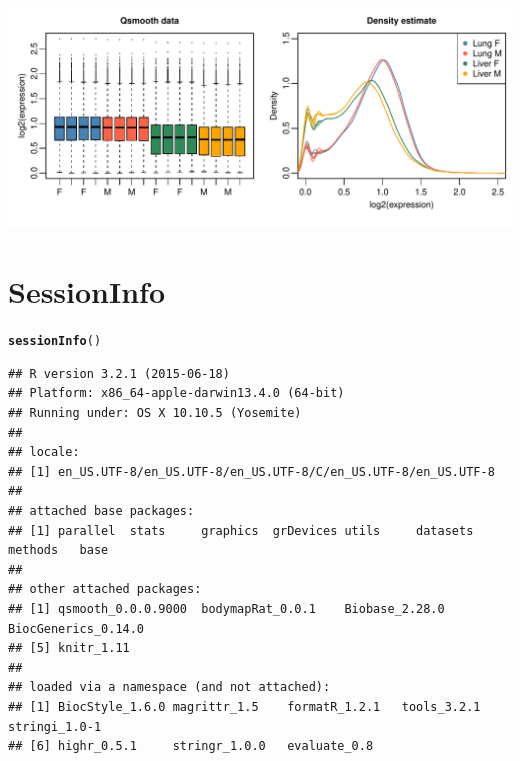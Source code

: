 \documentclass{article}\usepackage[]{graphicx}\usepackage[usenames,dvipsnames]{color}
\makeatletter
\def\maxwidth{ %
  \ifdim\Gin@nat@width>\linewidth
    \linewidth
  \else
    \Gin@nat@width
  \fi
}
\newcommand{\hlstd}[1]{\textcolor[rgb]{0.345,0.345,0.345}{#1}}%
\newcommand{\hlkwd}[1]{\textcolor[rgb]{0.737,0.353,0.396}{\textbf{#1}}}%
\newenvironment{kframe}{%
 \def\at@end@of@kframe{}%
 \ifinner\ifhmode%
  \def\at@end@of@kframe{\end{minipage}}%
  \begin{minipage}{\columnwidth}%
 \fi\fi%
 \def\FrameCommand##1{\hskip\@totalleftmargin \hskip-\fboxsep
 \colorbox{shadecolor}{##1}\hskip-\fboxsep
     \hskip-\linewidth \hskip-\@totalleftmargin \hskip\columnwidth}%
 \MakeFramed {\advance\hsize-\width
   \@totalleftmargin\z@ \linewidth\hsize
   \@setminipage}}%
 {\par\unskip\endMakeFramed%
 \at@end@of@kframe}
\newenvironment{knitrout}{}{} %
\makeatother
\begin{document}
\begin{knitrout}
\color{fgcolor}

{\centering \includegraphics[width=\maxwidth]{figure/norm_data14-1} 

}



\end{knitrout}

\section{SessionInfo}

\begin{knitrout}
\color{fgcolor}\begin{kframe}
\begin{alltt}
\hlkwd{sessionInfo}\hlstd{()}
\end{alltt}
\begin{verbatim}
## R version 3.2.1 (2015-06-18)
## Platform: x86_64-apple-darwin13.4.0 (64-bit)
## Running under: OS X 10.10.5 (Yosemite)
## 
## locale:
## [1] en_US.UTF-8/en_US.UTF-8/en_US.UTF-8/C/en_US.UTF-8/en_US.UTF-8
## 
## attached base packages:
## [1] parallel  stats     graphics  grDevices utils     datasets  methods   base     
## 
## other attached packages:
## [1] qsmooth_0.0.0.9000  bodymapRat_0.0.1    Biobase_2.28.0      BiocGenerics_0.14.0
## [5] knitr_1.11         
## 
## loaded via a namespace (and not attached):
## [1] BiocStyle_1.6.0 magrittr_1.5    formatR_1.2.1   tools_3.2.1     stringi_1.0-1  
## [6] highr_0.5.1     stringr_1.0.0   evaluate_0.8
\end{verbatim}
\end{kframe}
\end{knitrout}


\end{document}
